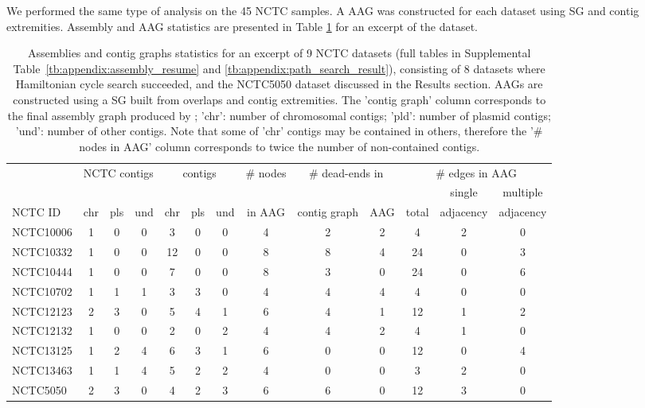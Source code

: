 \documentclass[./main.tex]{subfiles}
\newcommand{\modafterreview}[1]{#1}
\begin{document}
We performed the same type of analysis on the 45 NCTC samples. A \minimap AAG was constructed for each dataset using SG and \canu contig extremities. Assembly and AAG statistics are presented in Table \ref{tab:file_assembly_and_path_search_resume} for an excerpt of the dataset. 
\begin{table}[htbp]
    \centering
    \scriptsize
    \modafterreview{
    \begin{tabular}{l|ccc|ccc|c|cc|ccc}
    \hline
     & \multicolumn{3}{c|}{NCTC contigs} & \multicolumn{3}{c|}{\canu contigs} &
     {\# nodes} &
     \multicolumn{2}{c|}{\# dead-ends in} & \multicolumn{3}{c}{\# edges in AAG} \\
     & & & & & &  & & & & & single & multiple \\
    NCTC ID & chr & pls & und & chr & pls & und & in AAG & contig graph & AAG & total & adjacency & adjacency
    \\\hline
    NCTC10006 & 1 & 0 & 0 & 3  & 0 & 0 &    4  & 2  & 2 & 4  & 2 & 0 \\
    NCTC10332 & 1 & 0 & 0 & 12 & 0 & 0 &    8  & 8  & 4 & 24 & 0 & 3 \\
    NCTC10444 & 1 & 0 & 0 & 7  & 0 & 0 &    8  & 3  & 0 & 24 & 0 & 6 \\
    NCTC10702 & 1 & 1 & 1 & 3  & 3 & 0 &    4  & 4  & 4 & 4 & 0 & 0 \\
    NCTC12123 & 2 & 3 & 0 & 5  & 4 & 1 &    6  & 4  & 1 & 12 & 1 & 2 \\
    NCTC12132 & 1 & 0 & 0 & 2  & 0 & 2 &    4  & 4  & 2 & 4  & 1 & 0 \\
    NCTC13125 & 1 & 2 & 4 & 6  & 3 & 1 &    6  & 0  & 0 & 12 & 0 & 4 \\
    NCTC13463 & 1 & 1 & 4 & 5  & 2 & 2 &    4  & 0  & 0 & 3  & 2 & 0 \\
    NCTC5050  & 2 & 3 & 0 & 4  & 2 & 3 &    6  & 6  & 0 & 12 & 3 & 0 \\
    \hline
    \end{tabular}
    }
    \caption{Assemblies and contig graphs statistics for an excerpt of 9 NCTC datasets (full tables in Supplemental Table~\ref{tb:appendix:assembly_resume} and \ref{tb:appendix:path_search_result}), consisting of 8 datasets where Hamiltonian cycle search succeeded, and the NCTC5050 dataset discussed in the Results section. AAGs are constructed using a SG built from \minimap overlaps and \canu contig extremities.  The 'contig graph' column corresponds to the final assembly graph produced by \canu; 'chr': number of chromosomal contigs; 'pld': number of plasmid contigs; 'und': number of other contigs. Note that some of \canu\xspace 'chr' contigs may be contained in others, therefore the '\# nodes in AAG' column corresponds to twice the number of non-contained contigs.}
    \label{tab:file_assembly_and_path_search_resume}
\end{table}
\end{document}
